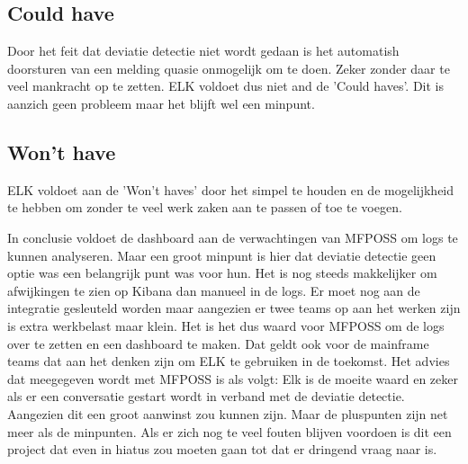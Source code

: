\subsection{Could have}
Door het feit dat deviatie detectie niet wordt gedaan is het automatish doorsturen van een melding quasie onmogelijk om te doen. Zeker zonder daar te veel mankracht op te zetten. ELK voldoet dus niet and de 'Could haves'. Dit is aanzich geen probleem maar het blijft wel een minpunt. 

\subsection{Won't have}
ELK voldoet aan de 'Won't haves' door het simpel te houden en de mogelijkheid te hebben om zonder te veel werk zaken aan te passen of toe te voegen.

In conclusie voldoet de dashboard aan de verwachtingen van MFPOSS om logs te kunnen analyseren. Maar een groot minpunt is hier dat deviatie detectie geen optie was een belangrijk punt was voor hun. Het is nog steeds makkelijker om afwijkingen te zien op Kibana dan manueel in de logs. Er moet nog aan de integratie gesleuteld worden maar aangezien er twee teams op aan het werken zijn is extra werkbelast maar klein. Het is het dus waard voor MFPOSS om de logs over te zetten en een dashboard te maken. Dat geldt ook voor de mainframe teams dat aan het denken zijn om ELK te gebruiken in de toekomst. Het advies dat meegegeven wordt met MFPOSS is als volgt: Elk is de moeite waard en zeker als er een conversatie gestart wordt in verband met de deviatie detectie. Aangezien dit een groot aanwinst zou kunnen zijn. Maar de pluspunten zijn net meer als de minpunten. Als er zich nog te veel fouten blijven voordoen is dit een project dat even in hiatus zou moeten gaan tot dat er dringend vraag naar is.


